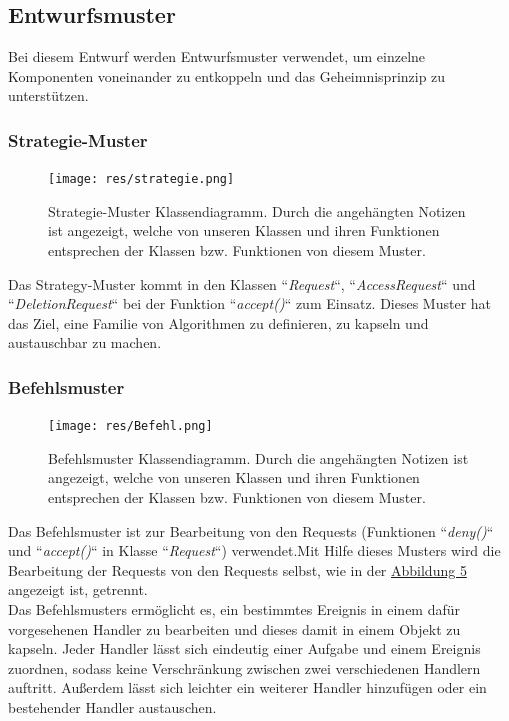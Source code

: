 \documentclass[parskip=full,11pt]{scrartcl}
\begin{document}
 \subsection{Entwurfsmuster}
 Bei diesem Entwurf werden Entwurfsmuster verwendet, um einzelne Komponenten voneinander zu entkoppeln und das \gls{Geheimnisprinzip} zu unterstützen. 
 \subsubsection*{Strategie-Muster}
 \begin{figure}[ht!]
 	\centering
 	\texttt{[image: res/strategie.png]}
 	\caption{Strategie-Muster Klassendiagramm. Durch die angehängten Notizen ist angezeigt, welche von unseren Klassen und ihren Funktionen entsprechen der Klassen bzw. Funktionen von diesem Muster. }
 \end{figure}
 Das Strategy-Muster kommt in den Klassen ``\textit{Request}``, ``\textit{AccessRequest}`` und ``\textit{DeletionRequest}`` bei der Funktion ``\textit{accept()}`` zum Einsatz. Dieses Muster hat das Ziel, eine Familie von Algorithmen zu definieren, zu kapseln und austauschbar zu machen.
 
 \subsubsection*{Befehlsmuster}
 \begin{figure}[ht!]
 	\centering
 	\texttt{[image: res/Befehl.png]}
 	\caption{Befehlsmuster Klassendiagramm. Durch die angehängten Notizen ist angezeigt, welche von unseren Klassen und ihren Funktionen entsprechen der Klassen bzw. Funktionen von diesem Muster.}
 	\label{Befehl}
 \end{figure}

 Das Befehlsmuster ist zur Bearbeitung von den Requests (Funktionen ``\textit{deny()}`` und ``\textit{accept()}`` in Klasse ``\textit{Request}``) verwendet.Mit Hilfe dieses Musters wird die Bearbeitung der Requests von den Requests selbst, wie in der   \hyperref[Befehl]{Abbildung 5} angezeigt ist, getrennt.\\
 Das Befehlsmusters ermöglicht es, ein bestimmtes Ereignis in einem dafür vorgesehenen Handler
 zu bearbeiten und dieses damit in einem Objekt zu kapseln. Jeder Handler lässt sich eindeutig einer Aufgabe
 und einem Ereignis zuordnen, sodass keine Verschränkung zwischen zwei verschiedenen Handlern auftritt.
 Außerdem lässt sich leichter ein weiterer Handler hinzufügen oder ein bestehender Handler austauschen.
 
\end{document}
